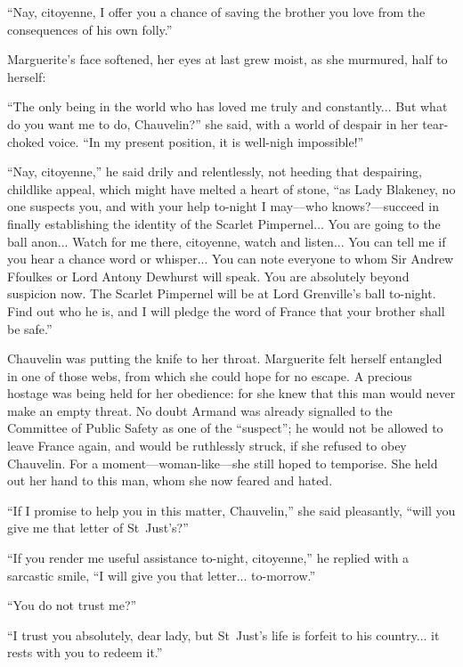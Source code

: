 \enquote{Nay, citoyenne, I offer you a chance of saving the brother you love from the consequences of his own folly.}

Marguerite's face softened, her eyes at last grew moist, as she murmured, half to herself:

\enquote{The only being in the world who has loved me truly and constantly... But what do you want me to do, Chauvelin?} she said, with a world of despair in her tear-choked voice. \enquote{In my present position, it is well-nigh impossible!}

\enquote{Nay, citoyenne,} he said drily and relentlessly, not heeding that despairing, childlike appeal, which might have melted a heart of stone, \enquote{as Lady Blakeney, no one suspects you, and with your help to-night I may---who knows?---succeed in finally establishing the identity of the Scarlet Pimpernel... You are going to the ball anon... Watch for me there, citoyenne, watch and listen... You can tell me if you hear a chance word or whisper... You can note everyone to whom Sir Andrew Ffoulkes or Lord Antony Dewhurst will speak. You are absolutely beyond suspicion now. The Scarlet Pimpernel will be at Lord Grenville's ball to-night. Find out who he is, and I will pledge the word of France that your brother shall be safe.}

Chauvelin was putting the knife to her throat. Marguerite felt herself entangled in one of those webs, from which she could hope for no escape. A precious hostage was being held for her obedience: for she knew that this man would never make an empty threat. No doubt Armand was already signalled to the Committee of Public Safety as one of the \enquote{suspect}; he would not be allowed to leave France again, and would be ruthlessly struck, if she refused to obey Chauvelin. For a moment---woman-like---she still hoped to temporise. She held out her hand to this man, whom she now feared and hated.

\enquote{If I promise to help you in this matter, Chauvelin,} she said pleasantly, \enquote{will you give me that letter of St~Just's?}

\enquote{If you render me useful assistance to-night, citoyenne,} he replied with a sarcastic smile, \enquote{I will give you that letter... to-morrow.}

\enquote{You do not trust me?}

\enquote{I trust you absolutely, dear lady, but St~Just's life is forfeit to his country... it rests with you to redeem it.}

